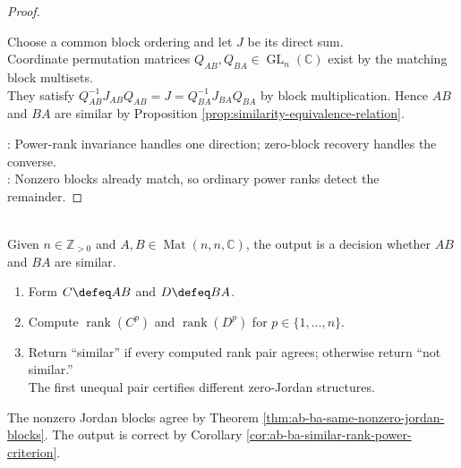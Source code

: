 \begin{corollary}
\begin{proof}
\begin{enumerate}[label=\roman*.]
Choose a common block ordering and let $J$ be its direct sum.\\
Coordinate permutation matrices $Q_{AB},Q_{BA}\in\operatorname{GL}_n(\mathbb{C})$ exist by the matching block multisets.\\
They satisfy $Q_{AB}^{-1}J_{AB}Q_{AB}=J=Q_{BA}^{-1}J_{BA}Q_{BA}$ by block multiplication. Hence $AB$ and $BA$ are similar by Proposition \ref{prop:similarity-equivalence-relation}.
\end{enumerate}
: Power-rank invariance handles one direction; zero-block recovery handles the converse.\\
: Nonzero blocks already match, so ordinary power ranks detect the remainder.
\end{proof}
\end{corollary}

\begin{computationmethod} \label{meth:checking-ab-ba-similarity} \\
Given $n\in\mathbb{Z}_{>0}$ and $A,B\in\operatorname{Mat}(n,n,\mathbb{C})$, the output is a decision whether $AB$ and $BA$ are similar.
\begin{enumerate}[label=(\roman*)]
\setlength{\itemsep}{0pt}
\item Form $C\defeq AB$ and $D\defeq BA$.
\item Compute $\operatorname{rank}(C^p)$ and $\operatorname{rank}(D^p)$ for $p\in\{1,\ldots,n\}$.
\item Return ``similar'' if every computed rank pair agrees; otherwise return ``not similar.''\\
The first unequal pair certifies different zero-Jordan structures.
\end{enumerate}
The nonzero Jordan blocks agree by Theorem \ref{thm:ab-ba-same-nonzero-jordan-blocks}. The output is correct by Corollary \ref{cor:ab-ba-similar-rank-power-criterion}.
\end{computationmethod}
